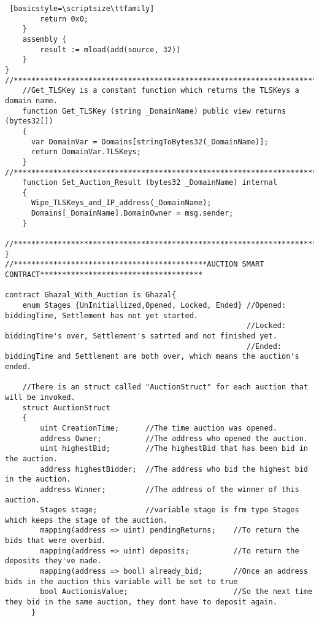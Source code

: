 \begin{lstlisting} [basicstyle=\scriptsize\ttfamily]
        return 0x0;
    }
    assembly {
        result := mload(add(source, 32))
    }
}
//************************************************************************************************************************//
    //Get_TLSKey is a constant function which returns the TLSKeys a domain name.
    function Get_TLSKey (string _DomainName) public view returns (bytes32[])
    {
      var DomainVar = Domains[stringToBytes32(_DomainName)];
      return DomainVar.TLSKeys;
    }
//************************************************************************************************************************//
    function Set_Auction_Result (bytes32 _DomainName) internal
    {
      Wipe_TLSKeys_and_IP_address(_DomainName);
      Domains[_DomainName].DomainOwner = msg.sender;
    }

//********************************************************************************************************************
}
//********************************************AUCTION SMART CONTRACT*************************************

contract Ghazal_With_Auction is Ghazal{
    enum Stages {UnInitiallized,Opened, Locked, Ended} //Opened: biddingTime, Settlement has not yet started.
                                                       //Locked: biddingTime's over, Settlement's satrted and not finished yet.
                                                       //Ended: biddingTime and Settlement are both over, which means the auction's ended.

    //There is an struct called "AuctionStruct" for each auction that will be invoked.
    struct AuctionStruct
    {
        uint CreationTime;      //The time auction was opened.
        address Owner;          //The address who opened the auction.
        uint highestBid;        //The highestBid that has been bid in the auction.
        address highestBidder;  //The address who bid the highest bid in the auction.
        address Winner;         //The address of the winner of this auction.
        Stages stage;           //variable stage is frm type Stages which keeps the stage of the auction.
        mapping(address => uint) pendingReturns;    //To return the bids that were overbid.
        mapping(address => uint) deposits;          //To return the deposits they've made.
        mapping(address => bool) already_bid;       //Once an address bids in the auction this variable will be set to true
        bool AuctionisValue;                        //So the next time they bid in the same auction, they dont have to deposit again.
      }


\end{lstlisting}
